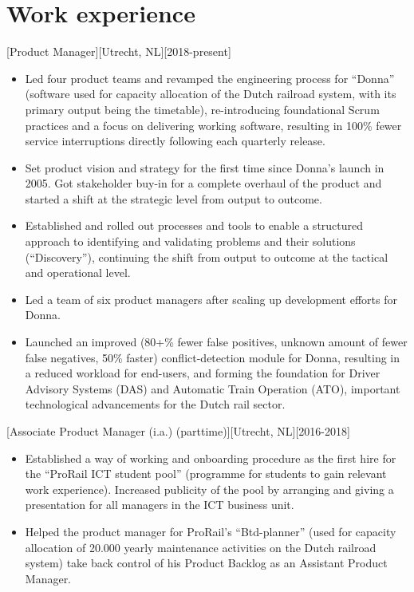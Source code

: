 \documentclass[10pt]{article}
\begin{document}
\makecvtitle

\section{Work experience}
\label{sec:work}

[Product Manager][Utrecht, NL][2018-present]
\begin{itemize}
      \item Led four product teams and revamped the engineering process for
            \enquote{Donna} (software used for capacity allocation of the Dutch railroad
            system, with its primary output being the timetable), re-introducing
            foundational Scrum practices and a focus on delivering working software,
            resulting in 100\% fewer service interruptions directly following each
            quarterly release.
      \item Set product vision and strategy for the first time since Donna's launch
            in 2005. Got stakeholder buy-in for a complete overhaul of the product and
            started a shift at the strategic level from output to outcome.
      \item Established and rolled out processes and tools to enable a structured
            approach to identifying and validating problems and their solutions
            (\enquote{Discovery}), continuing the shift from output to outcome at the
            tactical and operational level.
      \item Led a team of six product managers after scaling up development efforts
            for Donna.
      \item Launched an improved (80+\% fewer false positives, unknown amount of
            fewer false negatives, 50\% faster) conflict-detection module for Donna,
            resulting in a reduced workload for end-users, and forming the foundation for
            Driver Advisory Systems (DAS) and Automatic Train Operation (ATO), important
            technological advancements for the Dutch rail sector.
\end{itemize}

[Associate Product Manager (i.a.) (parttime)][Utrecht,
      NL][2016-2018]
\begin{itemize}
      \item Established a way of working and onboarding procedure as the first hire
            for the \enquote{ProRail ICT student pool} (programme for students to gain
            relevant work experience). Increased publicity of the pool by arranging and
            giving a presentation for all managers in the ICT business unit.
      \item Helped the product manager for ProRail's \enquote{Btd-planner} (used for
            capacity allocation of 20.000 yearly maintenance activities on the Dutch
            railroad system) take back control of his Product Backlog as an Assistant
            Product Manager.
\end{itemize}
\end{document}

